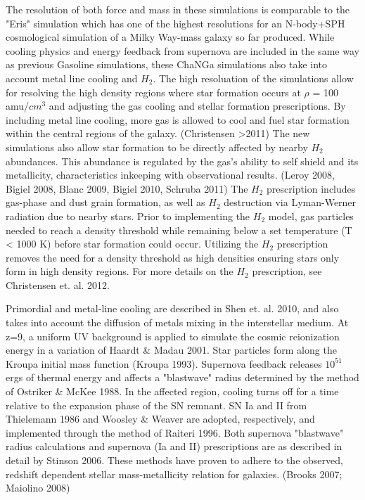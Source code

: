 \documentclass[manuscript]{aastex}
\begin{document}
	The resolution of both force and mass in these simulations is comparable to the "Eris" simulation which has one of the highest resolutions for an N-body+SPH cosmological simulation of a Milky Way-mass galaxy so far produced.  While cooling physics and energy feedback from supernova are included in the same way as previous Gasoline simulations, these ChaNGa simulations also take into account metal line cooling and $H_2$. The high resoluation of the simulations allow for resolving the high density regions where star formation occurs at $\rho$ = 100 amu/$cm^3$ and adjusting the gas cooling and stellar formation prescriptions. By including metal line cooling, more gas is allowed to cool and fuel star formation within the central regions of the galaxy. (Christensen >2011) The new simulations also allow star formation to be directly affected by nearby $H_2$ abundances. This abundance is regulated by the gas's ability to self shield and its metallicity, characteristics inkeeping with observational results. (Leroy 2008, Bigiel 2008, Blanc 2009, Bigiel 2010, Schruba 2011) The $H_2$ prescription includes gas-phase and dust grain formation, as well as $H_2$ destruction via Lyman-Werner radiation due to nearby stars. Prior to implementing the $H_2$ model, gas particles needed to reach a density threshold while remaining below a set temperature (T < 1000 K) before star formation could occur. Utilizing the $H_2$ prescription removes the need for a density threshold as high densities ensuring stars only form in high density regions. For more details on the $H_2$ prescription, see Christensen et. al. 2012. 

	Primordial and metal-line cooling are described in Shen et. al. 2010, and also takes into account the diffusion of metals mixing in the interstellar medium. At z=9, a uniform UV background is applied to simulate the cosmic reionization energy in a variation of Haardt \& Madau 2001. Star particles form along the Kroupa initial mass function (Kroupa 1993). Supernova feedback releases $10^51$ ergs of thermal energy and affects a "blastwave" radius determined by the method of Ostriker \& McKee 1988. In the affected region, cooling turns off for a time relative to the expansion phase of the SN remnant. SN Ia and II from Thielemann 1986 and Woosley \& Weaver are adopted, respectively, and implemented through the method of Raiteri 1996. Both supernova "blastwave" radius calculations and supernova (Ia and II) prescriptions are as described in detail by Stinson 2006. These methods have proven to adhere to the observed, redshift dependent stellar mass-metallicity relation for galaxies. (Brooks 2007; Maiolino 2008)
\end{document}
